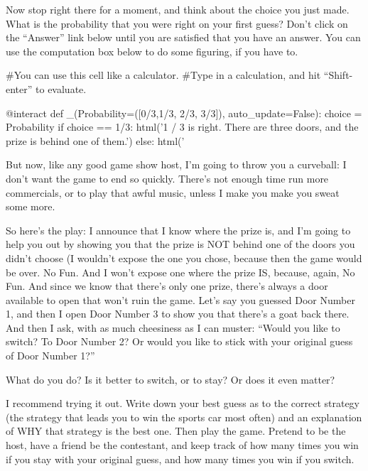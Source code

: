 Now stop right there for a moment, and think about the choice you just
made.  What is the probability that you were right on your first
guess?  Don't click on the ``Answer'' link below until you are
satisfied that you have an answer.  You can use the computation box
below to do some figuring, if you have to.


\begin{sageverbatim}
#You can use this cell like a calculator.  
#Type in a calculation, and hit ``Shift-enter'' to evaluate.
\end{sageverbatim}


\begin{sageverbatim}
@interact
def _(Probability=([0/3,1/3, 2/3, 3/3]), auto_update=False):
    choice = Probability
    if choice == 1/3:
         html('1 / 3 is right.  There are three doors, and the prize
         is behind one of them.')
    else:
         html('%
\end{sageverbatim}    


But now, like any good game show host, I'm going to throw you a
curveball: I don't want the game to end so quickly.  There's not
enough time run more commercials, or to play that awful music, unless
I make you make you sweat some more. 


So here's the play: I announce that I know where the prize is, and I'm
going to help you out by showing you that the prize is NOT behind one
of the doors you didn't choose (I wouldn't expose the one you chose,
because then the game would be over.  No Fun.  And I won't expose one
where the prize IS, because, again, No Fun. And since we know that
there's only one prize, there's always a door available to open that won't
ruin the game.  Let's say you guessed Door Number 1, and then I open
Door Number 3 to show you that there's a goat back there.  And then
I ask, with as much cheesiness as I can muster: ``Would you like to
switch?  To Door Number 2?  Or would you like to stick with your
original guess of Door Number 1?''


What do you do?  Is it better to switch, or to stay?  Or does it even
matter?


I recommend trying it out.  Write down your best guess as to the
correct strategy (the strategy that leads you to win the sports car
most often) and an explanation of WHY that strategy is the best one.
Then play the game.  Pretend to be the host, have a friend be the
contestant, and keep track of how many times you win if you stay with
your original guess, and how many times you win if you switch.


